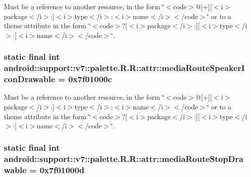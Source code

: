 Must be a reference to another resource, in the form \char`\"{}$<$code$>$@\mbox{[}+\mbox{]}\mbox{[}$<$i$>$package$<$/i$>$:\mbox{]}$<$i$>$type$<$/i$>$:$<$i$>$name$<$/i$>$$<$/code$>$\char`\"{} or to a theme attribute in the form \char`\"{}$<$code$>$?\mbox{[}$<$i$>$package$<$/i$>$:\mbox{]}\mbox{[}$<$i$>$type$<$/i$>$:\mbox{]}$<$i$>$name$<$/i$>$$<$/code$>$\char`\"{}. \hypertarget{classandroid_1_1support_1_1v7_1_1palette_1_1_r_1_1attr_71ec7211dc018c1742b473169b5f4233}{
\subsubsection[{mediaRouteSpeakerIconDrawable}]{\setlength{\rightskip}{0pt plus 5cm}static final int android::support::v7::palette.R.R::attr::mediaRouteSpeakerIconDrawable = 0x7f01000c}}
\label{classandroid_1_1support_1_1v7_1_1palette_1_1_r_1_1attr_71ec7211dc018c1742b473169b5f4233}


Must be a reference to another resource, in the form \char`\"{}$<$code$>$@\mbox{[}+\mbox{]}\mbox{[}$<$i$>$package$<$/i$>$:\mbox{]}$<$i$>$type$<$/i$>$:$<$i$>$name$<$/i$>$$<$/code$>$\char`\"{} or to a theme attribute in the form \char`\"{}$<$code$>$?\mbox{[}$<$i$>$package$<$/i$>$:\mbox{]}\mbox{[}$<$i$>$type$<$/i$>$:\mbox{]}$<$i$>$name$<$/i$>$$<$/code$>$\char`\"{}. \hypertarget{classandroid_1_1support_1_1v7_1_1palette_1_1_r_1_1attr_548aa6cce3cd6b3be82193b5c6fc3d3a}{
\subsubsection[{mediaRouteStopDrawable}]{\setlength{\rightskip}{0pt plus 5cm}static final int android::support::v7::palette.R.R::attr::mediaRouteStopDrawable = 0x7f01000d}}
\label{classandroid_1_1support_1_1v7_1_1palette_1_1_r_1_1attr_548aa6cce3cd6b3be82193b5c6fc3d3a}



